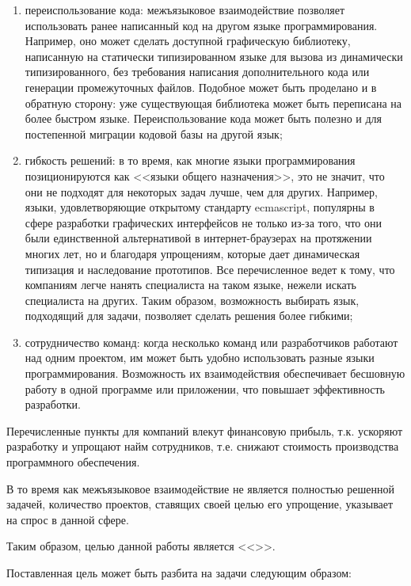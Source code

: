 \documentclass[times
]{itmo-student-thesis}
\begin{document}
\begin{enumerate}
\item переиспользование кода: межъязыковое взаимодействие позволяет использовать ранее написанный код на другом языке программирования. Например, оно может сделать доступной графическую библиотеку, написанную на статически типизированном языке для вызова из динамически типизированного, без требования написания дополнительного кода или генерации промежуточных файлов. Подобное может быть проделано и в обратную сторону: уже существующая библиотека может быть переписана на более быстром языке. Переиспользование кода может быть полезно и для постепенной миграции кодовой базы на другой язык;

\item гибкость решений: в то время, как многие языки программирования позиционируются как <<языки общего назначения>>, это не значит, что они не подходят для некоторых задач лучше, чем для других. Например, языки, удовлетворяющие открытому стандарту ecmascript, популярны в сфере разработки графических интерфейсов не только из-за того, что они были единственной альтернативой в интернет-браузерах на протяжении многих лет, но и благодаря упрощениям, которые дает динамическая типизация и наследование прототипов. Все перечисленное ведет к тому, что компаниям легче нанять специалиста на таком языке, нежели искать специалиста на других. Таким образом, возможность выбирать язык, подходящий для задачи, позволяет сделать решения более гибкими;

\item сотрудничество команд: когда несколько команд или разработчиков работают над одним проектом, им может быть удобно использовать разные языки программирования. Возможность их взаимодействия обеспечивает бесшовную работу в одной программе или приложении, что повышает эффективность разработки.
\end{enumerate}

Перечисленные пункты для компаний влекут финансовую прибыль, т.к. ускоряют разработку и упрощают найм сотрудников, т.е. снижают стоимость производства программного обеспечения.

В то время как межъязыковое взаимодействие не является полностью решенной задачей, количество проектов, ставящих своей целью его упрощение, указывает на спрос в данной сфере.

Таким образом, целью данной работы является <<\MyResearchAim>>.

Поставленная цель может быть разбита на задачи следующим образом:
\begin{enumerate}
	\MyResearchTargets
\end{enumerate}
\end{document}
